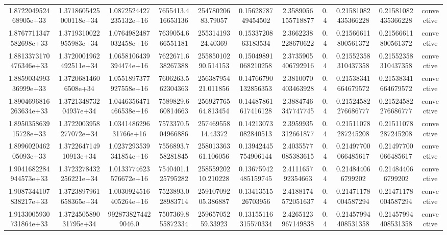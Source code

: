 \begin{table}
\begin{tabular}{ccccccccccc}
1.872204952468905e+33 & 1.3718605425000118e+34 & 1.0872524427235132e+16 & 7655413.416653136 & 25478020683.79057 & 0.1562878749454502 & 2.3589056155718877 & 0.4 & 0.21581082435366228 & 0.21581082435366228 & convective \\
1.8767711347582698e+33 & 1.3719310022955983e+34 & 1.0764982487032458e+16 & 7639054.666551181 & 25531419324.40369 & 0.1533720863183534 & 2.3662238228670622 & 0.4 & 0.21566611800561372 & 0.21566611800561372 & convective \\
1.8813373170476346e+33 & 1.3720001962492511e+34 & 1.0658106439394474e+16 & 7622671.638267388 & 25585010290.514153 & 0.15049891068210258 & 2.3735905406792916 & 0.4 & 0.21552358310437358 & 0.21552358310437358 & convective \\
1.885903499336999e+33 & 1.37206814606508e+34 & 1.0551897377927558e+16 & 7606263.562304363 & 25638795421.011856 & 0.14766790132856353 & 2.3810070403463928 & 0.4 & 0.21538341664679572 & 0.21538341664679572 & convective \\
1.8904696816263634e+33 & 1.372134873204937e+34 & 1.0446356471466538e+16 & 7589829.660814663 & 25692776564.813454 & 0.14487861617416128 & 2.3884746347747745 & 0.4 & 0.21524582276686777 & 0.21524582276686777 & convective \\
1.895035863915728e+33 & 1.3722003958277072e+34 & 1.034148629631766e+16 & 7573370.504966886 & 25746955814.43372 & 0.14213073082840513 & 2.3959935312661877 & 0.4 & 0.21511078287245208 & 0.21511078287245208 & convective \\
1.899602046205093e+33 & 1.372264714910913e+34 & 1.0237293539341854e+16 & 7556893.758281845 & 25801336361.106056 & 0.13942445754906144 & 2.4035577085383615 & 0.4 & 0.21497700066485617 & 0.21497700066485617 & convective \\
1.9041682284944573e+33 & 1.3723278432256221e+34 & 1.0133774623576672e+16 & 7540401.125795282 & 25855920210.210228 & 0.13675942485159745 & 2.411165792354663 & 0.4 & 0.214844066799202 & 0.214844066799202 & convective \\
1.9087344107838217e+33 & 1.3723897961658365e+34 & 1.0030924516405264e+16 & 7523893.028983714 & 25910709205.386887 & 0.1341351526703956 & 2.4188174572051637 & 0.4 & 0.21471178004587294 & 0.21471178004587294 & convective \\
1.9133005930731864e+33 & 1.372450589031795e+34 & 9928738274429046.0 & 7507369.855872334 & 25965705259.33923 & 0.13155116315570334 & 2.4265123967149838 & 0.4 & 0.21457994408531358 & 0.21457994408531358 & convective \\

\end{tabular}
\end{table}
